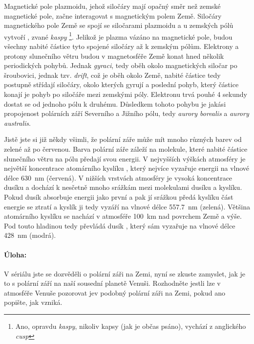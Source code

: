 \documentclass{../../../../style/mkimain}
\begin{document}
Magnetické pole plazmoidu, jehož siločáry mají opačný směr než zemské magnetické pole, začne 
interagovat s magnetickým polem Země. Siločáry magnetického pole Země se spojí se siločarami plazmoidu 
a u zemských pólů vytvoří , zvané \emph{kaspy} \footnote[2]{Ano, opravdu \emph{kaspy}, 
nikoliv kapsy (jak je občas psáno), vychází z anglického \emph{cusp}}. Jelikož je plazma vázáno na magnetické pole, 
budou všechny nabité částice  tyto spojené siločáry až k zemským pólům. Elektrony 
a protony slunečního větru budou v magnetosféře Země konat hned několik periodických pohybů.
Jednak \emph{gyraci}, tedy oběh okolo magnetických siločar po šroubovici, jednak tzv. \emph{drift}, 
což je oběh okolo Země, nabité částice tedy postupně střídají siločáry, okolo kterých gyrují a 
poslední pohyb, který částice konají je pohyb po siločáře mezi zemskými póly. Elektronu trvá 
pouhé 4 sekundy dostat se od jednoho pólu k druhému. Důsledkem tohoto pohybu je jakási 
propojenost polárních září Severního a Jižního pólu, tedy \emph{aurory borealis} a \emph{aurory australis}.

Jistě jste si již někdy všimli, že polární záře může mít mnoho různých barev od zelené až 
po červenou. Barva polární záře záleží na molekule, které nabité částice slunečního větru 
na pólu předají svou energii. V nejvyšších výškách atmosféry je největší koncentrace atomárního 
kyslíku , který nejvíce vyzařuje energii na vlnové délce \qty{630}{\nm} (červená). V nižších 
vrstvách atmosféry je vysoká koncentrace dusíku  a dochází k nesčetně mnoho srážkám mezi 
molekulami dusíku a kyslíku. Pokud dusík absorbuje energii jako první a pak jí srážkou předá 
kyslíku část energie se ztratí a kyslík ji tedy vyzáří na vlnové délce \qty{557.7}{\nm} (zelená).
Většina atomárního kyslíku se nachází v atmosféře \qty{100}{\km} nad povrchem Země a výše. Pod 
touto hladinou tedy převládá dusík , který sám vyzařuje na vlnové délce \qty{428}{\nm} (modrá).
\\
\\
\textbf{Úloha:}
\\
\\
V sériálu jste se dozvěděli o polární záři na Zemi, nyní se zkuste zamyslet, jak je to s polární září na naší 
sousední planetě Venuši. Rozhodněte jestli lze v atmosféře Venuše pozorovat jev podobný polární záři na Zemi, pokud ano popište, jak vzniká.
\end{document}
